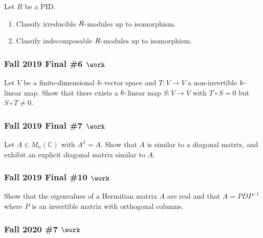 Let \(R\) be a PID.

\begin{enumerate}
\def\labelenumi{\alph{enumi}.}
\item
  Classify irreducible \(R{\hbox{-}}\)modules up to isomorphism.
\item
  Classify indecomposable \(R{\hbox{-}}\)modules up to isomorphism.
\end{enumerate}

\hypertarget{fall-2019-final-6-work}{%
\subsubsection{\texorpdfstring{Fall 2019 Final \#6
\(\work\)}{Fall 2019 Final \#6 \textbackslash work}}\label{fall-2019-final-6-work}}

Let \(V\) be a finite-dimensional \(k{\hbox{-}}\)vector space and
\(T:V\to V\) a non-invertible \(k{\hbox{-}}\)linear map. Show that there
exists a \(k{\hbox{-}}\)linear map \(S:V\to V\) with \(T\circ S = 0\)
but \(S\circ T\neq 0\).

\hypertarget{fall-2019-final-7-work}{%
\subsubsection{\texorpdfstring{Fall 2019 Final \#7
\(\work\)}{Fall 2019 Final \#7 \textbackslash work}}\label{fall-2019-final-7-work}}

Let \(A\in M_n({\mathbb{C}})\) with \(A^2 = A\). Show that \(A\) is
similar to a diagonal matrix, and exhibit an explicit diagonal matrix
similar to \(A\).

\hypertarget{fall-2019-final-10-work}{%
\subsubsection{\texorpdfstring{Fall 2019 Final \#10
\(\work\)}{Fall 2019 Final \#10 \textbackslash work}}\label{fall-2019-final-10-work}}

Show that the eigenvalues of a Hermitian matrix \(A\) are real and that
\(A = PDP^{-1}\) where \(P\) is an invertible matrix with orthogonal
columns.

\hypertarget{fall-2020-7-work}{%
\subsubsection{\texorpdfstring{Fall 2020 \#7
\(\work\)}{Fall 2020 \#7 \textbackslash work}}\label{fall-2020-7-work}}

